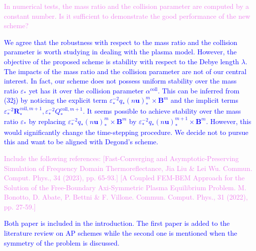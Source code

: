 \documentclass[12pt]{journalrebuttal}
\begin{document}
\begin{revcomment}
    \textcolor{violet}{
    In numerical tests, the mass ratio and the collision parameter 
    are computed by a constant number. Is it sufficient to
    demonstrate the good performance of the new scheme?
    }
\end{revcomment}
\begin{response}
    \textcolor{blue}{
    We agree that the robustness with respect to the mass ratio and the collision parameter
    is worth studying in dealing with the plasma model.
    However, the objective of the proposed scheme is stability with respect to
    the Debye length $\lambda$. The impacts of the mass ratio and the collision parameter
    are not of our central interest.
    In fact, our scheme does not possess uniform stability over the mass ratio $\varepsilon_*$
    yet has it over the collision parameter $\alpha^{\text{coll}}$. This can be
    inferred from (32j) by noticing the explicit term
    $\varepsilon_*^{-2}q_*(n\mathbf{u})_*^m \times \mathbf{B}^m$
    and the implicit terms
    $\varepsilon_*^{-2}\mathbf{R}^{\text{coll}, m+1}_*, \varepsilon_*^{-2}Q^{\text{coll}, m+1}_*$.
    It seems possible to achieve stability over the mass ratio $\varepsilon_*$
    by replacing $\varepsilon_*^{-2}q_*(n\mathbf{u})_*^m \times \mathbf{B}^m$
    by $\varepsilon_*^{-2}q_*(n\mathbf{u})_*^{m+1} \times \mathbf{B}^{m}$.
    However, this would significantly change the time-stepping procedure.
    We decide not to pursue this and want to be aligned with Degond's scheme.
    }
\end{response}


\begin{revcomment}
    \textcolor{violet}{
    Include the following references:
    [Fast-Converging and Asymptotic-Preserving Simulation of Frequency Domain Thermoreflectance, 
    Jia Liu \& Lei Wu. Commun. Comput. Phys., 34 (2023), pp. 65-93.]
    [A Coupled FEM-BEM Approach for the Solution of the Free-Boundary Axi-Symmetric Plasma 
    Equilibrium Problem. M. Bonotto, D. Abate, P. Bettni \& F. Villone. Commun. Comput. Phys., 31 
    (2022), pp. 27-59.]
    }
\end{revcomment}
\begin{response}
    \textcolor{blue}{
    Both paper is included in the introduction.
    The first paper is added to the literature review on AP schemes
    while the second one is mentioned when the symmetry of the problem is discussed.
    }
\end{response}
\end{document}
